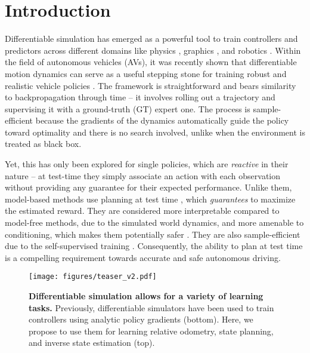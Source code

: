 \section{Introduction}
\label{sec: intro}

Differentiable simulation has emerged as a powerful tool to train controllers and predictors across different domains like physics \cite{holl2020learning, um2020solver, list2022learned}, graphics \cite{laine2020modular, jakob2022dr, zhao2020physics}, and robotics \cite{hu2019difftaichi, degrave2019differentiable, chen2022diffsrl, si2024difftactile}. Within the field of autonomous vehicles (AVs), it was recently shown that differentiable motion dynamics can serve as a useful stepping stone for training robust and realistic vehicle policies \cite{nachkov2024autonomous}. The framework is straightforward and bears similarity to backpropagation through time -- it involves rolling out a trajectory and supervising it with a ground-truth (GT) expert one. The process is sample-efficient because the gradients of the dynamics automatically guide the policy toward optimality and there is no search involved, unlike when the environment is treated as black box.

Yet, this has only been explored for single policies, which are \emph{reactive} \cite{sutton1991dyna} in their nature -- at test-time they simply associate an action with each observation without providing any guarantee for their expected performance. Unlike them, model-based methods use planning at test time \cite{polydoros2017survey}, which \emph{guarantees} to maximize the estimated reward. They are considered more interpretable compared to model-free methods, due to the simulated world dynamics, and more amenable to conditioning, which makes them potentially safer \cite{ostafew2016robust}. They are also sample-efficient due to the self-supervised training \cite{chua2018deep}. Consequently, the ability to plan at test time is a compelling requirement towards accurate and safe autonomous driving.


\begin{figure}[t]
    \centering
    \texttt{[image: figures/teaser\_v2.pdf]}
    \captionsetup{belowskip=-0.55cm}
    \caption{\textbf{Differentiable simulation allows for a variety of learning tasks.}
    Previously, differentiable simulators have been used to train controllers using analytic policy gradients (bottom). Here, we propose to use them for learning relative odometry, state planning, and inverse state estimation (top).}
    \label{fig: teaser}
\end{figure}

